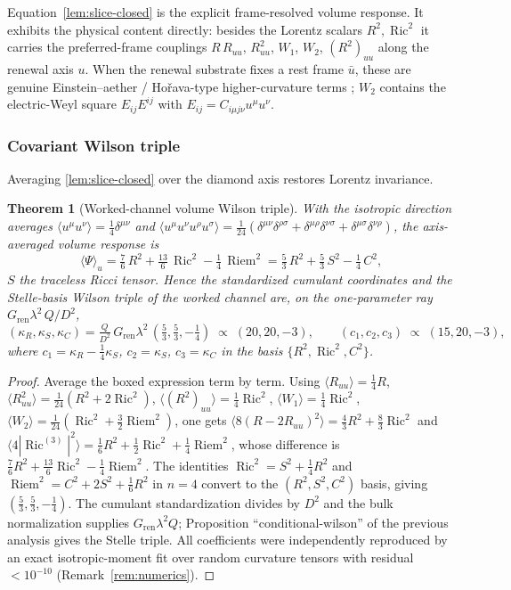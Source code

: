 \documentclass[11pt]{article}
\newtheorem{theorem}{Theorem}[section]
\theoremstyle{definition}
\theoremstyle{remark}
\newcommand{\Ric}{\operatorname{Ric}}
\newcommand{\Riem}{\operatorname{Riem}}
\newcommand{\Gren}{G_{\mathrm{ren}}}
\newcommand{\Weyl}{C}
\newcommand{\kR}{\kappa_R}
\newcommand{\kS}{\kappa_S}
\newcommand{\kC}{\kappa_C}
\newcommand{\Ruu}{R_{uu}}
\begin{document}
Equation~\eqref{lem:slice-closed} is the explicit frame-resolved volume response.  It
exhibits the physical content directly: besides the Lorentz scalars $R^2,\Ric^2$ it
carries the preferred-frame couplings $R\,\Ruu$, $\Ruu^2$, $W_1$, $W_2$, $(R^2)_{uu}$
along the renewal axis $u$.  When the renewal substrate fixes a rest frame $\bar u$,
these are genuine Einstein--aether / Ho\v{r}ava-type higher-curvature terms
\cite{JacobsonMattingly,Horava}; $W_2$ contains the electric-Weyl square
$E_{ij}E^{ij}$ with $E_{ij}=C_{i\mu j\nu}u^\mu u^\nu$.

\subsubsection{Covariant Wilson triple}
\label{sec:wilson}

Averaging \eqref{lem:slice-closed} over the diamond axis restores Lorentz invariance.

\begin{theorem}[Worked-channel volume Wilson triple]
\label{thm:triple}
With the isotropic direction averages
$\langle u^\mu u^\nu\rangle=\tfrac14\delta^{\mu\nu}$ and
$\langle u^\mu u^\nu u^\rho u^\sigma\rangle
=\tfrac1{24}(\delta^{\mu\nu}\delta^{\rho\sigma}+\delta^{\mu\rho}\delta^{\nu\sigma}
+\delta^{\mu\sigma}\delta^{\nu\rho})$, the axis-averaged volume response is
\[
 \langle\Psi\rangle_u
 =\tfrac76\,R^2+\tfrac{13}{6}\,\Ric^2-\tfrac14\,\Riem^2
 =\tfrac53\,R^2+\tfrac53\,S^2-\tfrac14\,\Weyl^2,
\]
$S$ the traceless Ricci tensor.  Hence the standardized cumulant coordinates and the
Stelle-basis Wilson triple of the worked channel are, on the one-parameter ray
$\Gren\lambda^2\,Q/D^2$,
\[
 (\kR,\kS,\kC)=\tfrac{Q}{D^2}\,\Gren\lambda^2\,(\tfrac53,\tfrac53,-\tfrac14)
 \;\propto\;(20,20,-3),
 \qquad
 (c_1,c_2,c_3)\;\propto\;(15,20,-3),
\]
where $c_1=\kR-\tfrac14\kS$, $c_2=\kS$, $c_3=\kC$ in the basis
$\{R^2,\Ric^2,\Weyl^2\}$.
\end{theorem}

\begin{proof}
Average the boxed expression term by term.  Using
$\langle\Ruu\rangle=\tfrac14R$, $\langle\Ruu^2\rangle=\tfrac1{24}(R^2+2\Ric^2)$,
$\langle(R^2)_{uu}\rangle=\tfrac14\Ric^2$,
$\langle W_1\rangle=\tfrac14\Ric^2$,
$\langle W_2\rangle=\tfrac1{24}(\Ric^2+\tfrac32\Riem^2)$, one gets
$\langle 8(R-2\Ruu)^2\rangle=\tfrac43R^2+\tfrac83\Ric^2$ and
$\langle4|\Ric^{(3)}|^2\rangle=\tfrac16R^2+\tfrac12\Ric^2+\tfrac14\Riem^2$, whose
difference is $\tfrac76R^2+\tfrac{13}6\Ric^2-\tfrac14\Riem^2$.  The
identities $\Ric^2=S^2+\tfrac14R^2$ and $\Riem^2=\Weyl^2+2S^2+\tfrac16R^2$ in $n=4$
convert to the $(R^2,S^2,\Weyl^2)$ basis, giving $(\tfrac53,\tfrac53,-\tfrac14)$.
The cumulant standardization divides by $D^2$ and the bulk normalization supplies
$\Gren\lambda^2 Q$; Proposition ``conditional-wilson'' of the previous analysis gives the
Stelle triple.  All coefficients were independently reproduced by an exact
isotropic-moment fit over random curvature tensors with residual $<10^{-10}$
(Remark~\ref{rem:numerics}).
\end{proof}
\end{document}
